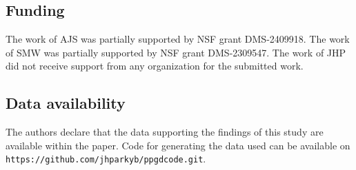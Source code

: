 \documentclass{amsart}
\theoremstyle{definition}
\begin{document}
\subsection*{Funding}

The work of AJS was partially supported by NSF grant DMS-2409918. The work of SMW was partially supported by NSF grant DMS-2309547. The work of JHP did not receive support from any organization for the submitted work.

\subsection*{Data availability}

The authors declare that the data supporting the findings of this study are available within the paper. Code for generating the data used can be available on \texttt{https://github.com/jhparkyb/ppgdcode.git}.




\end{document}
